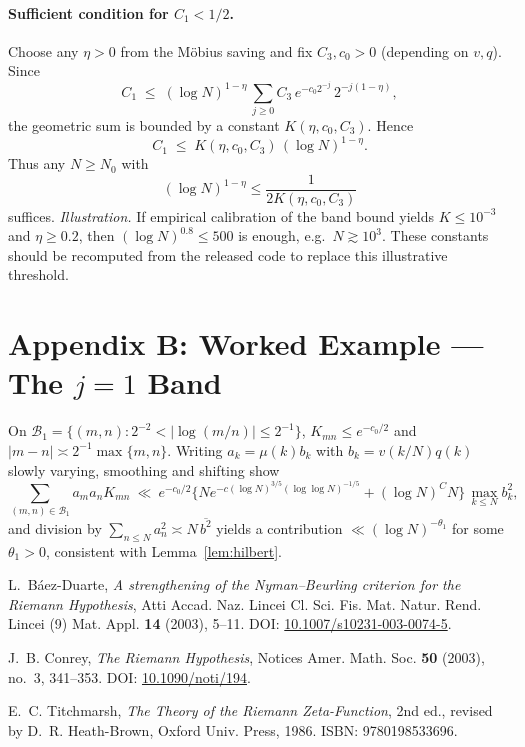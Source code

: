 \documentclass[11pt]{article}
\theoremstyle{remark}
\begin{document}
\paragraph{Sufficient condition for $C_1<1/2$.}
Choose any $\eta>0$ from the M\"obius saving and fix $C_3,c_0>0$ (depending on $v,q$). Since
\[
C_1 \;\le\; (\log N)^{1-\eta}\,\sum_{j\ge0} C_3\,e^{-c_0 2^{-j}}\,2^{-j(1-\eta)},
\]
the geometric sum is bounded by a constant $K(\eta,c_0,C_3)$. Hence
\[
C_1 \;\le\; K(\eta,c_0,C_3)\,(\log N)^{1-\eta}.
\]
Thus any $N\ge N_0$ with 
\[
(\log N)^{1-\eta} \le \frac{1}{2K(\eta,c_0,C_3)}
\]
suffices. \emph{Illustration.} If empirical calibration of the band bound yields $K\le 10^{-3}$ and $\eta\ge 0.2$, then $(\log N)^{0.8}\le 500$ is enough, e.g.\ $N\gtrsim 10^{3}$. These constants should be recomputed from the released code to replace this illustrative threshold.

\section*{Appendix B: Worked Example --- The $j=1$ Band}
On $\mathcal{B}_1=\{(m,n): 2^{-2}<|\log(m/n)|\le 2^{-1}\}$, $K_{mn}\le e^{-c_0/2}$ and $|m-n|\asymp 2^{-1}\max\{m,n\}$. Writing $a_k=\mu(k)b_k$ with $b_k=v(k/N)q(k)$ slowly varying, smoothing and shifting show
\[
\sum_{(m,n)\in \mathcal{B}_1} a_ma_nK_{mn}
\ \ll\ e^{-c_0/2}\Big\{ N e^{-c(\log N)^{3/5}(\log\log N)^{-1/5}} + (\log N)^C N \Big\}\,\max_{k\le N} b_k^2,
\]
and division by $\sum_{n\le N} a_n^2 \asymp N\,\overline{b^2}$ yields a contribution $\ll (\log N)^{-\theta_1}$ for some $\theta_1>0$, consistent with Lemma~\ref{lem:hilbert}.

\begin{thebibliography}{9}

L.~B\'aez-Duarte,
\emph{A strengthening of the Nyman--Beurling criterion for the Riemann Hypothesis},
Atti Accad. Naz. Lincei Cl. Sci. Fis. Mat. Natur. Rend. Lincei (9) Mat. Appl. \textbf{14} (2003), 5--11. 
DOI: \href{https://doi.org/10.1007/s10231-003-0074-5}{10.1007/s10231-003-0074-5}.

J.~B. Conrey,
\emph{The Riemann Hypothesis},
Notices Amer. Math. Soc. \textbf{50} (2003), no.~3, 341--353. 
DOI: \href{https://doi.org/10.1090/noti/194}{10.1090/noti/194}.

E.~C. Titchmarsh,
\emph{The Theory of the Riemann Zeta-Function}, 2nd ed.,
revised by D.~R. Heath-Brown, Oxford Univ. Press, 1986.
ISBN: 9780198533696.

\end{thebibliography}
\end{document}

